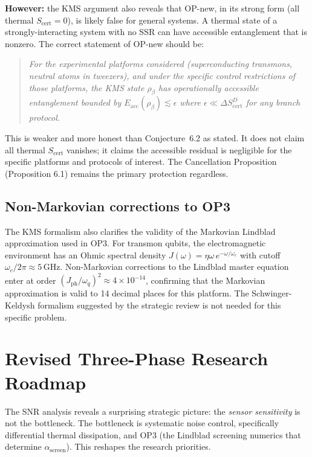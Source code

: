 \documentclass[11pt,letterpaper]{article}
\newcommand{\Scert}{S_{\mathrm{cert}}}
\newcommand{\asc}{\alpha_{\mathrm{screen}}}
\begin{document}
\textbf{However:} the KMS argument also reveals that OP-new, in its strong form (all
thermal $\Scert = 0$), is likely false for general systems.  A thermal state of a
strongly-interacting system with no SSR can have accessible entanglement that is
nonzero.  The correct statement of OP-new should be:

\begin{quote}
\textit{For the experimental platforms considered (superconducting transmons, neutral
atoms in tweezers), and under the specific control restrictions of those platforms,
the KMS state $\rho_\beta$ has operationally accessible entanglement bounded by
$E_{\mathrm{acc}}(\rho_\beta) \lesssim \epsilon$ where $\epsilon \ll \Delta\Scert^D$
for any branch protocol.}
\end{quote}

This is weaker and more honest than Conjecture~6.2 as stated.  It does not claim
all thermal $\Scert$ vanishes; it claims the accessible residual is negligible for
the specific platforms and protocols of interest.  The Cancellation Proposition
(Proposition 6.1) remains the primary protection regardless.

\subsection{Non-Markovian corrections to OP3}

The KMS formalism also clarifies the validity of the Markovian Lindblad approximation
used in OP3.  For transmon qubits, the electromagnetic environment has an Ohmic
spectral density $J(\omega) = \eta\omega\,e^{-\omega/\omega_c}$ with cutoff
$\omega_c/2\pi \approx 5$\,GHz.  Non-Markovian corrections to the Lindblad master
equation enter at order $(J_{\mathrm{ph}}/\omega_q)^2 \approx 4\times10^{-14}$,
confirming that the Markovian approximation is valid to 14 decimal places for this
platform.  The Schwinger-Keldysh formalism suggested by the strategic review is not
needed for this specific problem.

\section{Revised Three-Phase Research Roadmap}

The SNR analysis reveals a surprising strategic picture: the \emph{sensor sensitivity}
is not the bottleneck.  The bottleneck is systematic noise control, specifically
differential thermal dissipation, and OP3 (the Lindblad screening numerics that
determine $\asc$).  This reshapes the research priorities.
\end{document}

